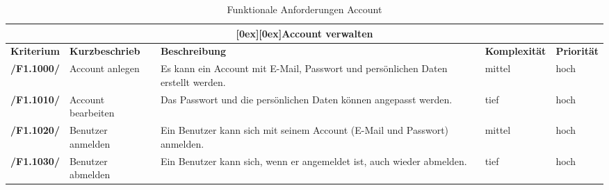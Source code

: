 \documentclass[10pt,a4paper,titlepage,twoside,german,final]{zhawreprt}
\newcommand{\AddRequirement}[2]{
\textbf{/#1#2/}
}
\newcommand{\F}[1]{
\AddRequirement{F1.}{#1}
}
\newcommand{\tableheader}[2]{\multicolumn{#1}{c}{\raisebox{-0.3em}[0ex][0ex]{\large{\textbf{#2}}}}}
\numberwithin{table}{chapter}
\begin{document}
\begin{table}[ht]\centering
\begin{tabular}{l|p{2.5cm}|p{5cm}|p{2cm}|p{1.5cm}}\hline
\tableheader{5}{Account verwalten}\\[0.3em]\hline
\textbf{Kriterium} & \textbf{Kurzbeschrieb} & \textbf{Beschreibung} & \textbf{Komplexität} & \textbf{Priorität}\\\hline
\F{1000} & Account anlegen & Es kann ein Account mit E-Mail, Passwort und persönlichen Daten erstellt werden. & mittel & hoch\\\hline
\F{1010} & Account bearbeiten & Das Passwort und die persönlichen Daten können angepasst werden. & tief & hoch\\\hline
\F{1020} & Benutzer anmelden & Ein Benutzer kann sich mit seinem Account (E-Mail und Passwort) anmelden. & mittel & hoch\\\hline
\F{1030} & Benutzer abmelden & Ein Benutzer kann sich, wenn er angemeldet ist, auch wieder abmelden. & tief & hoch\\\hline
\end{tabular}
\caption{Funktionale Anforderungen Account}\label{tbl:FuncAccount}
\end{table}
\end{document}
